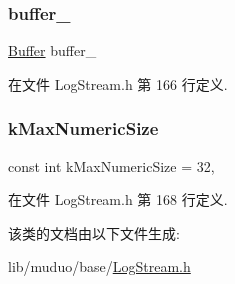 \subsubsection{\texorpdfstring{buffer\+\_\+}{buffer\_}}
{\footnotesize\ttfamily \hyperlink{classmuduo_1_1LogStream_ad711cf53b5df9fac2d62ecd2b9a8f763}{Buffer} buffer\+\_\+\hspace{0.3cm}{\ttfamily [private]}}



在文件 Log\+Stream.\+h 第 166 行定义.

\mbox{\label{classmuduo_1_1LogStream_a4f13d0c6eced96a9efd6622c16498cef}} 
\subsubsection{\texorpdfstring{k\+Max\+Numeric\+Size}{kMaxNumericSize}}
{\footnotesize\ttfamily const int k\+Max\+Numeric\+Size = 32\hspace{0.3cm}{\ttfamily [static]}, {\ttfamily [private]}}



在文件 Log\+Stream.\+h 第 168 行定义.



该类的文档由以下文件生成\+:\begin{DoxyCompactItemize}
\item 
lib/muduo/base/\hyperlink{LogStream_8h}{Log\+Stream.\+h}\end{DoxyCompactItemize}
